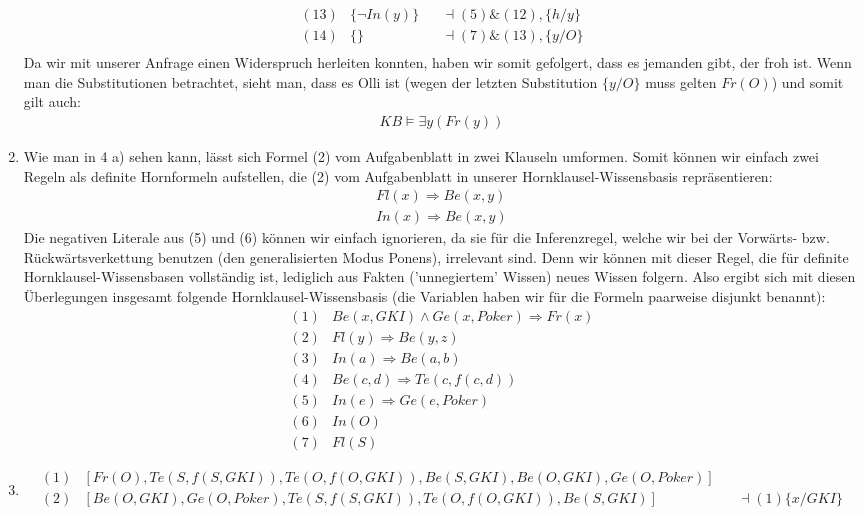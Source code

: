 \documentclass[a4paper,10pt]{article}
\begin{document}
\begin{enumerate}[~~a)]
\begin{align*}
(13) &\{\lnot In(y)\} &&\dashv (5) \& (12), \{h/y\}\\
(14) &\{\} && \dashv (7) \& (13), \{y/O\}\\
\end{align*}
Da wir mit unserer Anfrage einen Widerspruch herleiten konnten, haben wir somit gefolgert, dass es jemanden gibt, der froh ist. Wenn man die Substitutionen betrachtet, sieht man, dass es Olli ist (wegen der letzten Substitution $\{y/O\}$ muss gelten $Fr(O)$) und somit gilt auch:
\begin{align*}
KB \vDash \exists y (Fr(y))
\end{align*}
    \item
Wie man in 4 a) sehen kann, lässt sich Formel (2) vom Aufgabenblatt in zwei Klauseln umformen. Somit können wir einfach zwei Regeln als definite Hornformeln aufstellen, die (2) vom Aufgabenblatt in unserer Hornklausel-Wissensbasis repräsentieren:
\begin{align*}
Fl(x) \Rightarrow Be(x,y)\\
In (x) \Rightarrow Be(x,y)
\end{align*}
Die negativen Literale aus (5) und (6) können wir einfach ignorieren, da sie für die Inferenzregel, welche wir bei der Vorwärts- bzw. Rückwärtsverkettung benutzen (den generalisierten Modus Ponens), irrelevant sind. Denn wir können mit dieser Regel, die für definite Hornklausel-Wissensbasen vollständig ist, lediglich aus Fakten ('unnegiertem' Wissen) neues Wissen folgern.
Also ergibt sich mit diesen Überlegungen insgesamt folgende Hornklausel-Wissensbasis (die Variablen haben wir für die Formeln paarweise disjunkt benannt):
\begin{align*}
(1) &Be(x,GKI)\land Ge(x,Poker) \Rightarrow Fr(x)\\
(2) &Fl(y) \Rightarrow Be(y,z)\\
(3) &In (a) \Rightarrow Be(a,b)\\
(4) &Be(c,d) \Rightarrow Te(c,f(c,d))\\
(5) &In(e) \Rightarrow Ge(e,Poker)\\
(6) &In(O)\\
(7) &Fl(S)
\end{align*}
    \item
\begin{align*}
(1)&[Fr(O),Te(S,f(S,GKI)),Te(O,f(O,GKI)),Be(S,GKI),Be(O,GKI),Ge(O,Poker)]\\
(2)&[Be(O,GKI),Ge(O,Poker),Te(S,f(S,GKI)),Te(O,f(O,GKI)),Be(S,GKI)] &&\dashv (1) \{x/GKI\} \\

\end{align*}
\end{enumerate}
\end{document}
